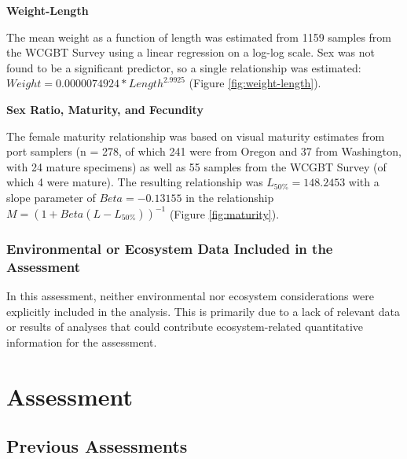 \documentclass[12pt,]{article}
\begin{document}
\vspace{.5cm}

\textbf{Weight-Length}

The mean weight as a function of length was estimated from 1159 samples
from the WCGBT Survey using a linear regression on a log-log scale. Sex
was not found to be a significant predictor, so a single relationship
was estimated: \(Weight = 0.0000074924 * Length ^ 2.9925\) (Figure
\ref{fig:weight-length}).

\vspace{.5cm}

\textbf{Sex Ratio, Maturity, and Fecundity}

The female maturity relationship was based on visual maturity estimates
from port samplers (n = 278, of which 241 were from Oregon and 37 from
Washington, with 24 mature specimens) as well as 55 samples from the
WCGBT Survey (of which 4 were mature). The resulting relationship was
\(L_{50\%} = 148.2453\) with a slope parameter of \(Beta = -0.13155\) in
the relationship \(M = (1 + Beta(L - L_{50\%}))^{-1}\) (Figure
\ref{fig:maturity}).

\vspace{.5cm}

\hypertarget{environmental-or-ecosystem-data-included-in-the-assessment}{%
\subsubsection{Environmental or Ecosystem Data Included in the
Assessment}\label{environmental-or-ecosystem-data-included-in-the-assessment}}

In this assessment, neither environmental nor ecosystem considerations
were explicitly included in the analysis. This is primarily due to a
lack of relevant data or results of analyses that could contribute
ecosystem-related quantitative information for the assessment.

\newpage

\hypertarget{assessment}{%
\section{Assessment}\label{assessment}}

\hypertarget{previous-assessments}{%
\subsection{Previous Assessments}\label{previous-assessments}}
\end{document}
